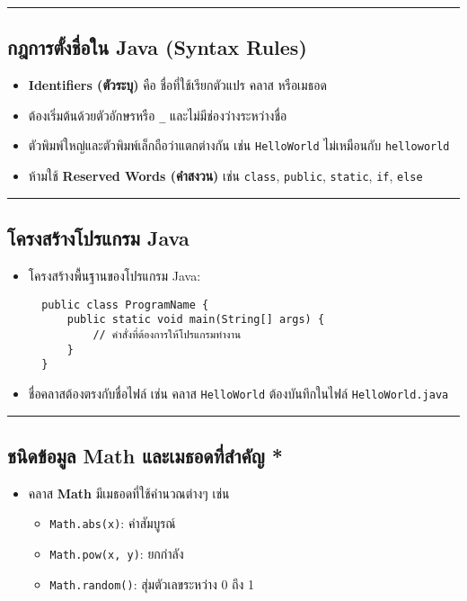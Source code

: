 \documentclass[11pt]{article}
\begin{document}
\noindent\rule{\textwidth}{0.5pt}
\subsection{กฎการตั้งชื่อใน Java (Syntax Rules)}
\label{sec:orge6d20f9}
\begin{itemize}
\item \textbf{Identifiers (ตัวระบุ)} คือ ชื่อที่ใช้เรียกตัวแปร คลาส หรือเมธอด
\item ต้องเริ่มต้นด้วยตัวอักษรหรือ \texttt{\_} และไม่มีช่องว่างระหว่างชื่อ
\item ตัวพิมพ์ใหญ่และตัวพิมพ์เล็กถือว่าแตกต่างกัน เช่น \texttt{HelloWorld} ไม่เหมือนกับ
\texttt{helloworld}
\item ห้ามใช้ \textbf{Reserved Words (คำสงวน)} เช่น \texttt{class}, \texttt{public}, \texttt{static}, \texttt{if},
\texttt{else}
\end{itemize}

\noindent\rule{\textwidth}{0.5pt}
\subsection{โครงสร้างโปรแกรม Java}
\label{sec:orga4b835e}
\begin{itemize}
\item โครงสร้างพื้นฐานของโปรแกรม Java:

\begin{verbatim}
  public class ProgramName {
      public static void main(String[] args) {
          // คำสั่งที่ต้องการให้โปรแกรมทำงาน
      }
  }
\end{verbatim}

\item ชื่อคลาสต้องตรงกับชื่อไฟล์ เช่น คลาส \texttt{HelloWorld} ต้องบันทึกในไฟล์
\texttt{HelloWorld.java}
\end{itemize}

\noindent\rule{\textwidth}{0.5pt}
\subsection{ชนิดข้อมูล Math และเมธอดที่สำคัญ *}
\label{sec:org868097c}
\begin{itemize}
\item คลาส \textbf{Math} มีเมธอดที่ใช้คำนวณต่างๆ เช่น
\begin{itemize}
\item \texttt{Math.abs(x)}: ค่าสัมบูรณ์
\item \texttt{Math.pow(x, y)}: ยกกำลัง
\item \texttt{Math.random()}: สุ่มตัวเลขระหว่าง 0 ถึง 1
\end{itemize}
\end{itemize}
\end{document}
